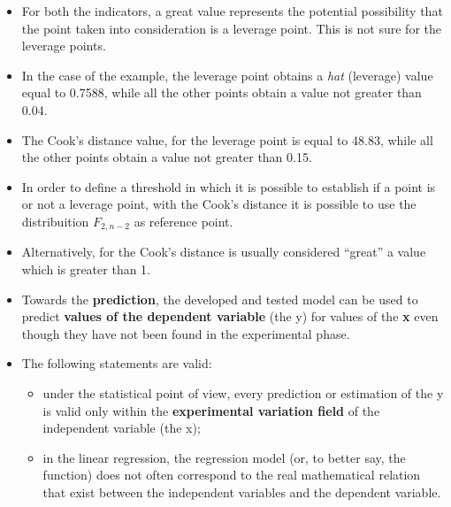 \begin{frame}
  \begin{itemize}
    \item For both the indicators, a great value represents the potential possibility that the point taken into consideration is a leverage point. This is not sure for the leverage points.
    \item In the case of the example, the leverage point obtains a \textit{hat} (leverage) value equal to 0.7588, while all the other points obtain a value not greater than 0.04.
    \item The Cook's distance value, for the leverage point is equal to 48.83, while all the other points obtain a value not greater than 0.15.
    \item In order to define a threshold in which it is possible to establish if a point is or not a leverage point, with the Cook's distance it is possible to use the distribuition $ F_{2,n-2} $ as reference point. 
    \item Alternatively, for the Cook's distance is usually considered ``great'' a value which is greater than 1.
\end{itemize}
\end{frame}





\begin{frame}
  \vspace*{.25cm}
  \begin{itemize}
    \item Towards the \textbf{prediction}, the developed and tested model can be used to predict \textbf{values of the dependent variable} (the y) for values of the \textbf{x} even though they have not been found in the experimental phase.
    \vspace*{.5cm}
    \item The following statements are valid:
    \begin{itemize}
      \item under the statistical point of view, every prediction or estimation of the y is valid only within the \textbf{experimental variation field} of the independent variable (the x);
      \vspace*{.15cm}
      \item in the linear regression, the regression model (or, to better say, the function) does not often correspond to the real mathematical relation that exist between the independent variables and the dependent variable.
    \end{itemize}
  \end{itemize}
\end{frame}

